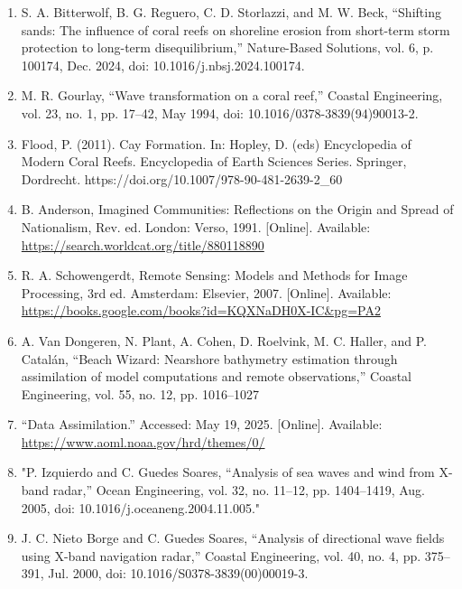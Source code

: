 \documentclass{article}
\begin{document}
\begin{sloppypar}
\begin{enumerate}
    \item{S. A. Bitterwolf, B. G. Reguero, C. D. Storlazzi, and M. W. Beck, “Shifting sands: The influence of coral reefs on shoreline erosion from short-term storm protection to long-term disequilibrium,” Nature-Based Solutions, vol. 6, p. 100174, Dec. 2024, doi: 10.1016/j.nbsj.2024.100174.}

    \item{M. R. Gourlay, “Wave transformation on a coral reef,” Coastal Engineering, vol. 23, no. 1, pp. 17–42, May 1994, doi: 10.1016/0378-3839(94)90013-2.}

    \item{Flood, P. (2011). Cay Formation. In: Hopley, D. (eds) Encyclopedia of Modern Coral Reefs. Encyclopedia of Earth Sciences Series. Springer, Dordrecht. https://doi.org/10.1007/978-90-481-2639-2_60}

    \item{B. Anderson, Imagined Communities: Reflections on the Origin and Spread of Nationalism, Rev. ed. London: Verso, 1991. [Online]. Available: \url{https://search.worldcat.org/title/880118890}}


    \item{R. A. Schowengerdt, Remote Sensing: Models and Methods for Image Processing, 3rd ed. Amsterdam: Elsevier, 2007. [Online]. Available: \url{https://books.google.com/books?id=KQXNaDH0X-IC&pg=PA2}}

    \item{A. Van Dongeren, N. Plant, A. Cohen, D. Roelvink, M. C. Haller, and P. Catalán, “Beach Wizard: Nearshore bathymetry estimation through assimilation of model computations and remote observations,” Coastal Engineering, vol. 55, no. 12, pp. 1016–1027}

    \item{“Data Assimilation.” Accessed: May 19, 2025. [Online]. Available: \url{https://www.aoml.noaa.gov/hrd/themes/0/}}

    \item{"P. Izquierdo and C. Guedes Soares, “Analysis of sea waves and wind from X-band radar,” Ocean Engineering, vol. 32, no. 11–12, pp. 1404–1419, Aug. 2005, doi: 10.1016/j.oceaneng.2004.11.005."}

    \item{J. C. Nieto Borge and C. Guedes Soares, “Analysis of directional wave fields using X-band navigation radar,” Coastal Engineering, vol. 40, no. 4, pp. 375–391, Jul. 2000, doi: 10.1016/S0378-3839(00)00019-3.}


\end{enumerate}
\end{sloppypar}
\end{document}
